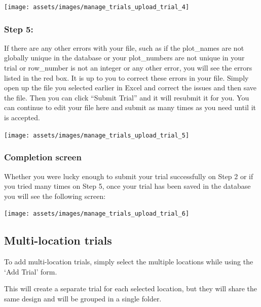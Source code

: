 \documentclass[
  12pt,
]{book}
\begin{document}
\begin{center}\texttt{[image: assets/images/manage\_trials\_upload\_trial\_4]} \end{center}

\hypertarget{step-5}{%
\subsubsection*{Step 5:}\label{step-5}}


If there are any other errors with your file, such as if the plot\_names are not globally unique in the database or your plot\_numbers are not unique in your trial or row\_number is not an integer or any other error, you will see the errors listed in the red box. It is up to you to correct these errors in your file. Simply open up the file you selected earlier in Excel and correct the issues and then save the file. Then you can click ``Submit Trial'' and it will resubmit it for you. You can continue to edit your file here and submit as many times as you need until it is accepted.

\begin{center}\texttt{[image: assets/images/manage\_trials\_upload\_trial\_5]} \end{center}

\hypertarget{completion-screen}{%
\subsubsection*{Completion screen}\label{completion-screen}}


Whether you were lucky enough to submit your trial successfully on Step 2 or if you tried many times on Step 5, once your trial has been saved in the database you will see the following screen:

\begin{center}\texttt{[image: assets/images/manage\_trials\_upload\_trial\_6]} \end{center}

\hypertarget{multi-location-trials}{%
\subsection{Multi-location trials}\label{multi-location-trials}}

To add multi-location trials, simply select the multiple locations while using the `Add Trial' form.

This will create a separate trial for each selected location, but they will share the same design and will be grouped in a single folder.
\end{document}
